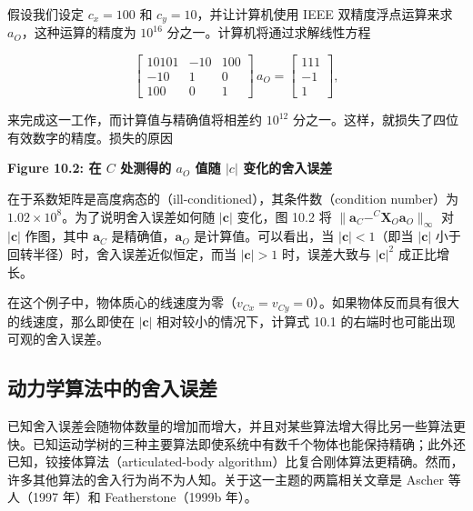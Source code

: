 \documentclass[10pt,a4paper]{book}
\theoremstyle{thmstyle} %
\theoremstyle{defstyle} %
\theoremstyle{prostyle} %
\begin{document}
假设我们设定 $c_{x}=100$ 和 $c_{y}=10$，并让计算机使用 IEEE 双精度浮点运算来求 $a_{O}$，这种运算的精度为 $10^{16}$ 分之一。计算机将通过求解线性方程



$$
\left[ \begin{array}{lll} { 10 10 1 } & { - 10 } & { 10 0 } \\{ - 10 } & { 1 } & { 0 } \\{ 10 0 } & { 0 } & { 1 } \end{array} \right] \, a _ { O } = \left[ \begin{array}{l} { 11 1 } \\{ - 1 } \\{ 1 } \end{array} \right] ,
$$



来完成这一工作，而计算值与精确值将相差约 $10^{12}$ 分之一。这样，就损失了四位有效数字的精度。损失的原因



\noindent\textbf{Figure 10.2: 在 $C$ 处测得的 $a_{O}$ 值随 $|c|$ 变化的舍入误差}





在于系数矩阵是高度病态的（ill-conditioned），其条件数（condition number）为 $1.02 \times 10^{8}$。为了说明舍入误差如何随 $|\boldsymbol{c}|$ 变化，图 10.2 将 $\|\boldsymbol{a}_{C}-^{C} \boldsymbol{X}_{O} \boldsymbol{a}_{O}\|_{\infty}$ 对 $|\boldsymbol{c}|$ 作图，其中 $\boldsymbol{a}_{C}$ 是精确值，$\boldsymbol{a}_{O}$ 是计算值。可以看出，当 $|\boldsymbol{c}|<1$（即当 $|\boldsymbol{c}|$ 小于回转半径）时，舍入误差近似恒定，而当 $|\boldsymbol{c}|>1$ 时，误差大致与 $|\boldsymbol{c}|^{2}$ 成正比增长。



在这个例子中，物体质心的线速度为零（$v_{Cx} = v_{Cy} = 0$）。如果物体反而具有很大的线速度，那么即使在 $|\mathbf{c}|$ 相对较小的情况下，计算式 10.1 的右端时也可能出现可观的舍入误差。



\subsection{动力学算法中的舍入误差}





已知舍入误差会随物体数量的增加而增大，并且对某些算法增大得比另一些算法更快。已知运动学树的三种主要算法即使系统中有数千个物体也能保持精确；此外还已知，铰接体算法（articulated-body algorithm）比复合刚体算法更精确。然而，许多其他算法的舍入行为尚不为人知。关于这一主题的两篇相关文章是 Ascher 等人（1997 年）和 Featherstone（1999b 年）。
\end{document}
